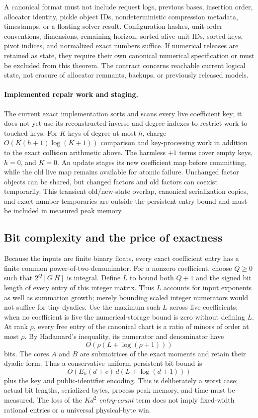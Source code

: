 A canonical format must not include request logs, previous bases, insertion
order, allocator identity, pickle object IDs, nondeterministic compression
metadata, timestamps, or a floating solver result. Configuration hashes,
unit-order conventions, dimensions, remaining horizon, sorted alive-unit
IDs, sorted keys, pivot indices, and normalized exact numbers suffice.
If numerical releases are retained as state, they require their own
canonical numerical specification or must be excluded from this theorem.
The contract concerns reachable current logical state, not erasure of
allocator remnants, backups, or previously released models.

\paragraph{Implemented repair work and staging.}
The current exact implementation sorts and scans every live coefficient key;
it does not yet use its reconstructed inverse and degree indexes to restrict
work to touched keys. For $K$ keys of degree at most $h$, charge
$O(K(h+1)\log(K+1))$ comparison and key-processing work in addition to
the exact collision arithmetic above. The harmless $+1$ terms cover empty
keys, $h=0$, and $K=0$. An update stages its new coefficient map before
committing, while the old live map remains available for atomic failure.
Unchanged factor objects can be shared, but changed factors and old factors
can coexist temporarily. This transient old/new-state overlap, canonical
serialization copies, and exact-number temporaries are outside the persistent
entry bound and must be included in measured peak memory.

\subsection{Bit complexity and the price of exactness}
Because the inputs are finite binary floats, every exact coefficient entry
has a finite common power-of-two denominator. For a nonzero coefficient,
choose $Q\ge0$ such that $2^Q[G\ H]$ is integral. Define $L$ to bound
both $Q+1$ and the signed bit length of every entry of this integer matrix.
Thus $L$ accounts for input exponents as well as summation growth; merely
bounding scaled integer numerators would not suffice for tiny dyadics.
Use the maximum such $L$ across live coefficients; when no coefficient is
live the numerical-storage bound is zero without defining $L$.
At rank $\rho$, every free
entry of the canonical chart is a ratio of minors of order at most
$\rho$. By Hadamard's inequality, its numerator and denominator have
\[
 O\!\left(\rho(L+\log(\rho+1))\right)
\]
bits. The cores $A$ and $B$ are submatrices of the exact moments and retain
their dyadic form. Thus a conservative uniform persistent bit bound is
\[
 O\!\left(E_h(d+c)\,d(L+\log(d+1))\right)
\]
plus the key and public-identifier encoding. This is deliberately a worst
case; actual bit lengths, serialized bytes, process peak memory, and time
must be measured. The loss of the $K d^2$ \emph{entry-count} term does not
imply fixed-width rational entries or a universal physical-byte win.

